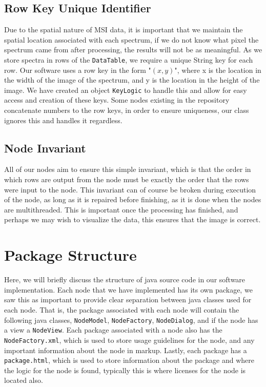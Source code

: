 \documentclass[11pt,openany]{book}
\begin{document}
\subsection{Row Key Unique Identifier}
Due to the spatial nature of MSI data, it is important that we maintain the spatial location associated with each spectrum, if we do not know what pixel the spectrum came from after processing, the results will not be as meaningful. As we store spectra in rows of the \texttt{DataTable}, we require a unique String key for each row. Our software uses a row key in the form "$(x,y)$", where x is the location in the width of the image of the spectrum, and y is the location in the height of the image. We have created an object \texttt{KeyLogic} to handle this and allow for easy access and creation of these keys. Some nodes existing in the repository concatenate numbers to the row keys, in order to ensure uniqueness, our class ignores this and handles it regardless.

\subsection{Node Invariant}
All of our nodes aim to ensure this simple invariant, which is that the order in which rows are output from the node must be exactly the order that the rows were input to the node. This invariant can of course be broken during execution of the node, as long as it is repaired before finishing, as it is done when the nodes are multithreaded. This is important once the processing has finished, and perhaps we may wish to visualize the data, this ensures that the image is correct.

\section{Package Structure}
Here, we will briefly discuss the structure of java source code in our software implementation. Each node that we have implemented has its own package, we saw this as important to provide clear separation between java classes used for each node. That is, the package associated with each node will contain the following java classes, \texttt{NodeModel}, \texttt{NodeFactory}, \texttt{NodeDialog}, and if the node has a view a \texttt{NodeView}. Each package associated with a node also has the \texttt{NodeFactory.xml}, which is used to store usage guidelines for the node, and any important information about the node in markup. Lastly, each package has a \texttt{package.html}, which is used to store information about the package and where the logic for the node is found, typically this is where licenses for the node is located also.
\end{document}
